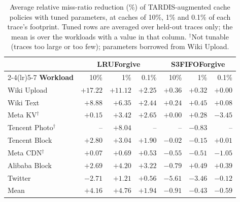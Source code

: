 \begin{table}[t]
\centering
\small
\caption{Average relative miss-ratio reduction (\%) of TARDIS-augmented cache policies with tuned parameters, at caches of 10\%, 1\% and 0.1\% of each trace's footprint. Tuned rows are averaged over held-out traces only; the mean is over the workloads with a value in that column. $^\dagger$Not tunable (traces too large or too few); parameters borrowed from Wiki Upload.}
\label{tab:tardis-tuned-sizes}
\begin{tabular}{l rrr rrr}
\toprule
 & \multicolumn{3}{c}{\textbf{LRUForgive}} & \multicolumn{3}{c}{\textbf{S3FIFOForgive}} \\
\cmidrule(lr){2-4}\cmidrule(lr){5-7}
\textbf{Workload} & 10\% & 1\% & 0.1\% & 10\% & 1\% & 0.1\% \\
\midrule
Wiki Upload & $+17.22$ & $+11.12$ & $+2.25$ & $+0.36$ & $+0.32$ & $+0.00$ \\
Wiki Text & $+8.88$ & $+6.35$ & $+2.44$ & $+0.24$ & $+0.45$ & $+0.08$ \\
Meta KV$^\dagger$ & $+0.15$ & $+3.42$ & $+2.65$ & $+0.00$ & $+0.28$ & $-3.45$ \\
Tencent Photo$^\dagger$ & -- & $+8.04$ & -- & -- & $-0.83$ & -- \\
Tencent Block & $+2.80$ & $+3.04$ & $+1.90$ & $-0.02$ & $-0.15$ & $+0.01$ \\
Meta CDN$^\dagger$ & $+0.07$ & $+0.69$ & $+0.53$ & $-0.55$ & $-0.51$ & $-1.05$ \\
Alibaba Block & $+2.69$ & $+4.20$ & $+3.22$ & $-0.79$ & $+0.49$ & $+0.39$ \\
Twitter & $-2.71$ & $+1.21$ & $+0.56$ & $-5.61$ & $-3.46$ & $-0.12$ \\
\midrule
Mean & $+4.16$ & $+4.76$ & $+1.94$ & $-0.91$ & $-0.43$ & $-0.59$ \\
\bottomrule
\end{tabular}
\end{table}
